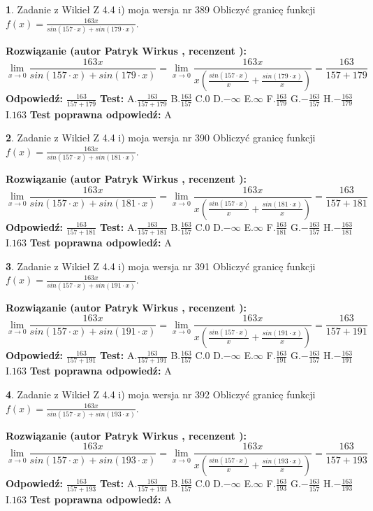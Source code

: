 \documentclass[12pt, a4paper]{article}
\theoremstyle{definition} %
\newtheorem{zad}{}
\newcommand{\zadStart}[1]{\begin{zad}#1\newline}
\newcommand{\zadStop}{\end{zad}}
\newcommand{\rozwStart}[2]{\noindent \textbf{Rozwiązanie (autor #1 , recenzent #2): }\newline}
\newcommand{\rozwStop}{\newline}
\newcommand{\odpStart}{\noindent \textbf{Odpowiedź:}\newline}
\newcommand{\odpStop}{\newline}
\newcommand{\testStart}{\noindent \textbf{Test:}\newline}
\newcommand{\testStop}{\newline}
\newcommand{\kluczStart}{\noindent \textbf{Test poprawna odpowiedź:}\newline}
\newcommand{\kluczStop}{\newline}
\begin{document}
\zadStart{Zadanie z Wikieł Z 4.4 i) moja wersja nr 389}
Obliczyć granicę funkcji $f(x)=\frac{163x}{sin(157\cdot x) +sin(179\cdot x)}$.
\zadStop
\rozwStart{Patryk Wirkus}{}
$$\lim\limits_{x\to 0}\frac{163x}{sin(157\cdot x) +sin(179\cdot x)}=\lim\limits_{x\to 0}\frac{163x}{x(\frac{sin(157\cdot x)}{x}+\frac{sin(179\cdot x)}{x})}=\frac{163}{157+179}$$
\rozwStop
\odpStart
$\frac{163}{157+179}$
\odpStop
\testStart
A.$\frac{163}{157+179}$
B.$\frac{163}{157}$
C.$0$
D.$-\infty$
E.$\infty$
F.$\frac{163}{179}$
G.$-\frac{163}{157}$
H.$-\frac{163}{179}$
I.$163$
\testStop
\kluczStart
A
\kluczStop



\zadStart{Zadanie z Wikieł Z 4.4 i) moja wersja nr 390}
Obliczyć granicę funkcji $f(x)=\frac{163x}{sin(157\cdot x) +sin(181\cdot x)}$.
\zadStop
\rozwStart{Patryk Wirkus}{}
$$\lim\limits_{x\to 0}\frac{163x}{sin(157\cdot x) +sin(181\cdot x)}=\lim\limits_{x\to 0}\frac{163x}{x(\frac{sin(157\cdot x)}{x}+\frac{sin(181\cdot x)}{x})}=\frac{163}{157+181}$$
\rozwStop
\odpStart
$\frac{163}{157+181}$
\odpStop
\testStart
A.$\frac{163}{157+181}$
B.$\frac{163}{157}$
C.$0$
D.$-\infty$
E.$\infty$
F.$\frac{163}{181}$
G.$-\frac{163}{157}$
H.$-\frac{163}{181}$
I.$163$
\testStop
\kluczStart
A
\kluczStop



\zadStart{Zadanie z Wikieł Z 4.4 i) moja wersja nr 391}
Obliczyć granicę funkcji $f(x)=\frac{163x}{sin(157\cdot x) +sin(191\cdot x)}$.
\zadStop
\rozwStart{Patryk Wirkus}{}
$$\lim\limits_{x\to 0}\frac{163x}{sin(157\cdot x) +sin(191\cdot x)}=\lim\limits_{x\to 0}\frac{163x}{x(\frac{sin(157\cdot x)}{x}+\frac{sin(191\cdot x)}{x})}=\frac{163}{157+191}$$
\rozwStop
\odpStart
$\frac{163}{157+191}$
\odpStop
\testStart
A.$\frac{163}{157+191}$
B.$\frac{163}{157}$
C.$0$
D.$-\infty$
E.$\infty$
F.$\frac{163}{191}$
G.$-\frac{163}{157}$
H.$-\frac{163}{191}$
I.$163$
\testStop
\kluczStart
A
\kluczStop



\zadStart{Zadanie z Wikieł Z 4.4 i) moja wersja nr 392}
Obliczyć granicę funkcji $f(x)=\frac{163x}{sin(157\cdot x) +sin(193\cdot x)}$.
\zadStop
\rozwStart{Patryk Wirkus}{}
$$\lim\limits_{x\to 0}\frac{163x}{sin(157\cdot x) +sin(193\cdot x)}=\lim\limits_{x\to 0}\frac{163x}{x(\frac{sin(157\cdot x)}{x}+\frac{sin(193\cdot x)}{x})}=\frac{163}{157+193}$$
\rozwStop
\odpStart
$\frac{163}{157+193}$
\odpStop
\testStart
A.$\frac{163}{157+193}$
B.$\frac{163}{157}$
C.$0$
D.$-\infty$
E.$\infty$
F.$\frac{163}{193}$
G.$-\frac{163}{157}$
H.$-\frac{163}{193}$
I.$163$
\testStop
\kluczStart
A
\kluczStop
\end{document}

